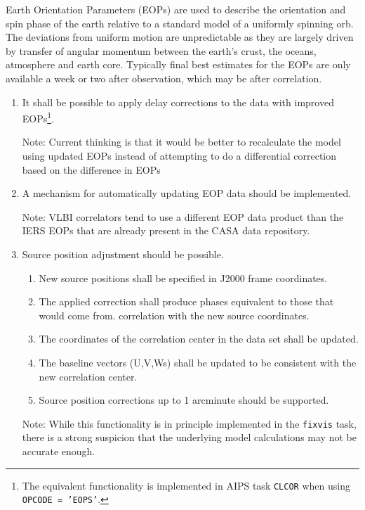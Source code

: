 \documentclass[11pt,a4paper]{article}
\begin{document}
Earth Orientation Parameters (EOPs) are used to describe the
orientation and spin phase of the earth relative to a standard model
of a uniformly spinning orb. The deviations from uniform motion are
unpredictable as they are largely driven by transfer of angular
momentum between the earth's crust, the oceans, atmosphere and earth
core. Typically final best estimates for the EOPs are only available a
week or two after observation, which may be after correlation.

\begin{enumerate}[subseclist]

\item It shall be possible to apply delay corrections to the data with
  improved EOPs\footnote{The equivalent functionality is implemented
    in AIPS task \texttt{CLCOR} when using \texttt{OPCODE = 'EOPS'}.}.

  Note: Current thinking is that it would be better to recalculate the
  model using updated EOPs instead of attempting to do a differential
  correction based on the difference in EOPs

\item A mechanism for automatically updating EOP data should be
  implemented.

  Note: VLBI correlators tend to use a different EOP data product than
  the IERS EOPs that are already present in the CASA data repository.

\item Source position adjustment should be possible.

  \begin{enumerate}[subsecsublist]

  \item New source positions shall be specified in J2000 frame coordinates.

  \item The applied correction shall produce phases equivalent to those that would come from.
    correlation with the new source coordinates.

  \item The coordinates of the correlation center in the data set shall be updated.

  \item The baseline vectors (U,V,Ws) shall be updated to be consistent with the new correlation
    center.

  \item Source position corrections up to 1 arcminute should be supported.

  \end{enumerate}

  Note: While this functionality is in principle implemented in the
  \texttt{fixvis} task, there is a strong suspicion that the
  underlying model calculations may not be accurate enough.
  
\end{enumerate}
\end{document}
